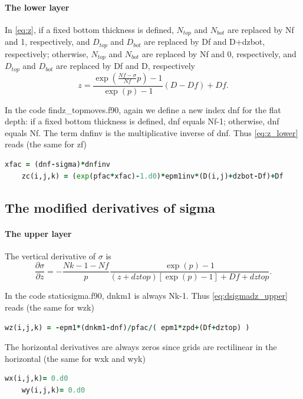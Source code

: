 \documentclass[12pt,letterpaper,titlepage]{article}
\newcommand{\Blue}[1]{{\color{blue}#1}}
\begin{document}
\paragraph{The lower layer}
In \eqref{eq:z}, if a fixed bottom thickness is defined, $N_{top}$ and $N_{bot}$ are replaced by Nf and 1, respectively, and $D_{top}$ and $D_{bot}$ are replaced by Df and D+dzbot, respectively; otherwise, $N_{top}$ and $N_{bot}$ are replaced by Nf and 0, respectively, and $D_{top}$ and $D_{bot}$ are replaced by Df and D, respectively
\begin{equation}
  z = \frac{\exp\left(\frac{Nf-\sigma}{Nf} p\right) - 1}{\exp(p)-1} (D - Df)+Df. \label{eq:z_lower}
\end{equation}

In the code findz\_topmoves.f90, again we define a new index \Blue{dnf} for the flat depth: if a fixed bottom thickness is defined, dnf equals Nf-1; otherwise, dnf equals Nf. The term \Blue{dnfinv} is the multiplicative inverse of dnf. Thus \eqref{eq:z_lower} reads (the same for zf)
\begin{lstlisting}[language=Fortran, caption=findz\_topmoves.f90 (for the lower layer)]
    xfac = (dnf-sigma)*dnfinv 
    zc(i,j,k) = (exp(pfac*xfac)-1.d0)*epm1inv*(D(i,j)+dzbot-Df)+Df
\end{lstlisting}

\subsection{The modified derivatives of sigma}

\paragraph{The upper layer}
The vertical derivative of $\sigma$ is
\begin{equation}
\frac{\partial \sigma}{\partial z} =-\frac{Nk-1-Nf}{p}\frac{\exp(p)-1}{(z+dztop)[\exp(p)-1]+Df+dztop}. \label{eq:dsigmadz_upper}
\end{equation}

In the code staticsigma.f90, dnkm1 is always Nk-1. Thus \eqref{eq:dsigmadz_upper} reads (the same for wzk)
\begin{lstlisting}[language=Fortran, caption=staticsigma.f90 (for the upper layer)]
    wz(i,j,k) = -epm1*(dnkm1-dnf)/pfac/( epm1*zpd+(Df+dztop) )
\end{lstlisting}

The horizontal derivatives are always zeros since grids are rectilinear in the horizontal (the same for wxk and wyk)
\begin{lstlisting}[language=Fortran, caption=staticsigma.f90 (for the upper layer)]
    wx(i,j,k)= 0.d0
    wy(i,j,k)= 0.d0
\end{lstlisting}
\end{document}
